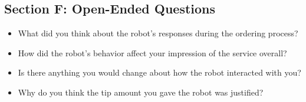 \documentclass[conference]{IEEEtran}
\begin{document}
\subsection{Section F: Open-Ended Questions}
\begin{itemize}
\item What did you think about the robot’s responses during the ordering process?
\item How did the robot’s behavior affect your impression of the service overall?
\item Is there anything you would change about how the robot interacted with you?
\item Why do you think the tip amount you gave the robot was justified?
\end{itemize}
\end{document}
